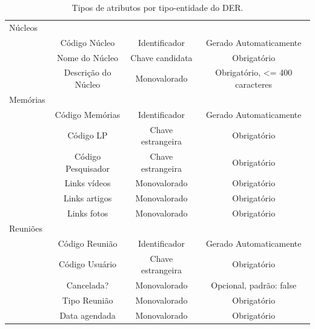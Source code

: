 \documentclass[11pt]{../../classes/ifscarticle}
\begin{document}
\begin{table}[h]
\begin{tabular}{l|c|c|c|}
    \hline
    Núcleos \\
                  & Código Núcleo       & Identificador     & Gerado Automaticamente         \\
                  & Nome do Núcleo      & Chave candidata   & Obrigatório                    \\
                  & Descrição do Núcleo & Monovalorado      & Obrigatório, <= 400 caracteres \\
    \hline
    Memórias \\
                  & Código Memórias     & Identificador     & Gerado Automaticamente \\
                  & Código LP           & Chave estrangeira & Obrigatório            \\
                  & Código Pesquisador  & Chave estrangeira & Obrigatório            \\
                  & Links vídeos        & Monovalorado      & Obrigatório            \\
                  & Links artigos       & Monovalorado      & Obrigatório            \\
                  & Links fotos         & Monovalorado      & Obrigatório            \\
    \hline
    Reuniões \\
                  & Código Reunião      & Identificador     & Gerado Automaticamente  \\
                  & Código Usuário      & Chave estrangeira & Obrigatório             \\
                  & Cancelada?          & Monovalorado      & Opcional, padrão: false \\
                  & Tipo Reunião        & Monovalorado      & Obrigatório             \\
                  & Data agendada       & Monovalorado      & Obrigatório             \\
    \hline
  \end{tabular}
  \caption{Tipos de atributos por tipo-entidade do DER.}
\end{table}




\end{document}
